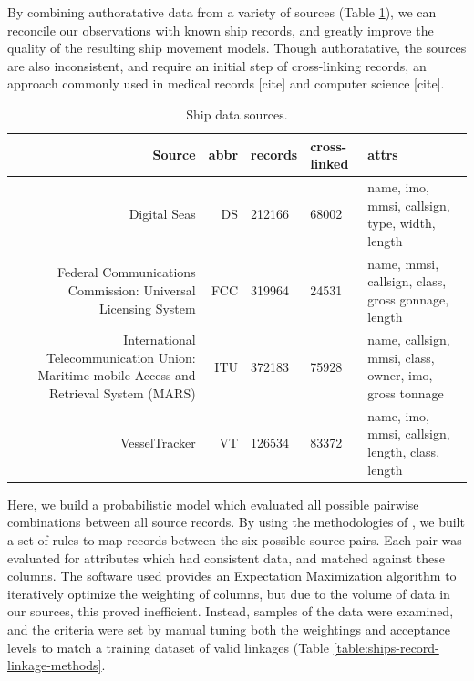
By combining authoratative data from a variety of sources (Table \ref{table:ships-data-sources}), we can reconcile our observations with known ship records, and greatly improve the quality of the resulting ship movement models. Though authoratative, the sources are also inconsistent, and require an initial step of cross-linking records, an approach commonly used in medical records [cite] and computer science [cite].

\begin{table}[htbp]
  \begin{tabular}{rrlll} %
    \hline
    Source & abbr & records & cross-linked & attrs \\
    \hline
     Digital Seas & DS & 212166 & 68002 & name, imo, mmsi, callsign, type, width, length \\
     Federal Communications Commission: Universal Licensing System & FCC & 319964 & 24531 & name, mmsi, callsign, class, gross gonnage, length \\
     International Telecommunication Union: Maritime mobile Access and Retrieval System (MARS) & ITU & 372183 & 75928 & name, callsign, mmsi, class, owner, imo, gross tonnage\\ 
     VesselTracker & VT & 126534 & 83372 &  name, imo, mmsi, callsign, length, class, length
  \end{tabular}
  \caption{Ship data sources.}
  \label{table:ships-data-sources}
\end{table}

Here, we build a probabilistic model which evaluated all possible pairwise combinations between all source records. By using the methodologies of %
, we built a set of rules to map records between the six possible source pairs. Each pair was evaluated for attributes which had consistent data, and matched against these columns. The software used %
provides an Expectation Maximization algorithm to iteratively optimize the weighting of columns, but due to the volume of data in our sources, this proved inefficient. Instead, samples of the data were examined, and the criteria were set by manual tuning both the weightings and acceptance levels to match a training dataset of valid linkages (Table \ref{table:ships-record-linkage-methods}. %

